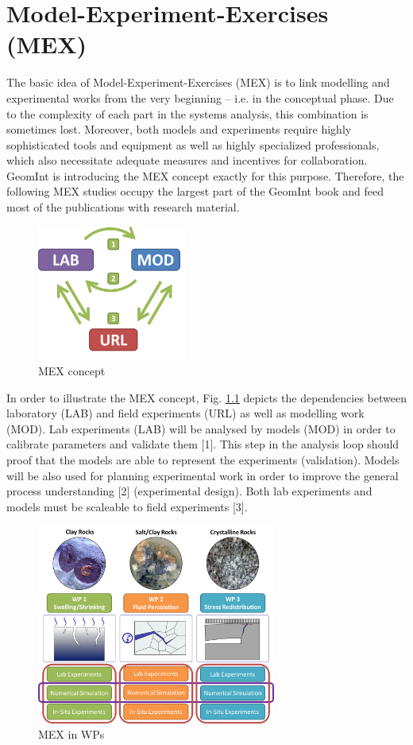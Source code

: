 \chapter{Model-Experiment-Exercises (MEX)}
\label{cha:mex}

The basic idea of Model-Experiment-Exercises (MEX) is to link modelling and experimental works from the very beginning – i.e. in the conceptual phase. Due to the complexity of each part in the systems analysis, this combination is sometimes lost. Moreover, both models and experiments require highly sophisticated tools and equipment as well as highly specialized professionals, which also necessitate adequate measures and incentives for collaboration. GeomInt is introducing the MEX concept exactly for this purpose. Therefore, the following MEX studies occupy the largest part of the GeomInt book and feed most of the publications with research material.

\begin{figure}
\includegraphics[width=4.9cm]{figures/geomint-mex-a}
\caption{MEX concept}
\label{fig:mex-concept-generic}
\end{figure}
In order to illustrate the MEX concept, Fig. \ref{fig:mex-concept-generic} depicts the dependencies between laboratory (LAB) and field experiments (URL) as well as modelling work (MOD). Lab experiments (LAB) will be analysed by models (MOD) in order to calibrate parameters and validate them [1]. This step in the analysis loop should proof that the models are able to represent the experiments (validation). Models will be also used for planning experimental work in order to improve the general process understanding [2] (experimental design). Both lab experiments and models must be scaleable to field experiments [3].

\begin{figure}
\centering
\includegraphics[width=0.7\textwidth]{figures/geomint-mex-b.png}
\caption{MEX in WPs}
\label{fig:mex-concept-wps}
\end{figure}

